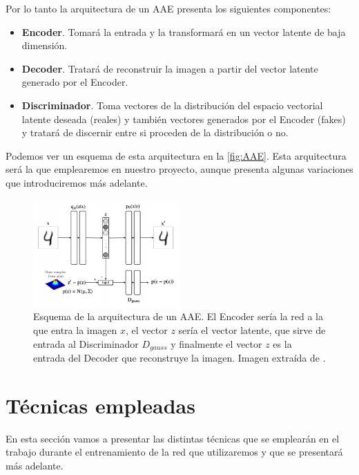             \medskip

            \noindent Por lo tanto la arquitectura de un AAE presenta los siguientes componentes: 

            \begin{itemize}
                \item \textbf{Encoder}. Tomará la entrada y la transformará en un vector latente de baja dimensión.
                \item \textbf{Decoder}. Tratará de reconstruir la imagen a partir del vector latente generado por el Encoder. 
                \item \textbf{Discriminador}. Toma vectores de la distribución del espacio vectorial latente deseada (reales) y también vectores generados por el Encoder (fakes) y tratará de discernir entre si proceden de la distribución o no.
            \end{itemize}

            \medskip

            \noindent Podemos ver un esquema de esta arquitectura en la \autoref{fig:AAE}. Esta arquitectura será la que emplearemos en nuestro proyecto, aunque presenta algunas variaciones que introduciremos más adelante.
            
            \begin{figure}[!h]
                \centering
                \includegraphics[width=0.5\textwidth]{img/AAE.png}
                \caption{Esquema de la arquitectura de un AAE. El Encoder sería la red a la que entra la imagen $x$, el vector $z$ sería el vector latente, que sirve de entrada al Discriminador $D_{gauss}$ y finalmente el vector $z$ es la entrada del Decoder que reconstruye la imagen. Imagen extraída de \cite{AAE}.}
                \label{fig:AAE}
            \end{figure}

            

\section{Técnicas empleadas}
    \noindent En esta sección vamos a presentar las distintas técnicas que se emplearán en el trabajo durante el entrenamiento de la red que utilizaremos y que se presentará más adelante. 


